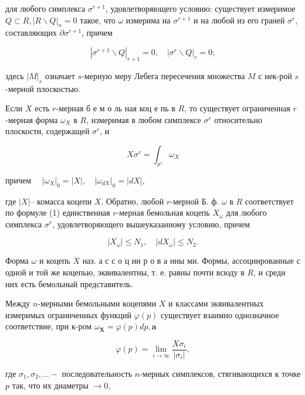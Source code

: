 \documentclass[10pt]{article}
\begin{document}
для любого симплекса $\sigma^{r+1}$, удовлетворяющего условию: существует измеримое $Q \subset R,|R \backslash Q|_{n}=0$ такое, что $\omega$ измерима на $\sigma^{r+1}$ и на любой из его граней $\sigma^{r}$, составляющих $\partial \sigma^{r+1}$, причем



\[

\left|\sigma^{r+1} \backslash Q\right|_{r+1}=0, \quad\left|\sigma^{r} \backslash Q\right|_{r}=0 ;

\]



здесь $|M|_{s}$ означает $s$-мерную меру Лебега пересечения множества $M$ с нек-рой $s$-мерной плоскостью.



Если $X$ есть $r$-мерная б е м о ль ная коц е пь в $R$, то существует ограниченная $r$-мерная форма $\omega_{X}$ в $R$, измеримая в любом симплексе $\sigma^{r}$ относительно плоскости, содержащей $\sigma^{r}$, и



\[

X \sigma^{r}=\int_{\sigma^{r}} \omega_{X}

\]



причем $\quad\left|\omega_{X}\right|_{0}=|X|, \quad\left|\omega_{d X}\right|_{0}=|d X|$,



где $|X|$-- комасса коцепи $X$. Обратно, любой $r$-мерной Б. ф. $\omega$ в $R$ соответствует по формуле (1) единственная $r$-мерная бемольная коцепь $X_{\omega}$ для любого симплекса $\sigma^{r}$, удовлетворяющего вышеуказанному условию, причем



\[

\left|X_{\omega}\right| \leqslant N_{1}, \quad\left|d X_{\omega}\right| \leqslant N_{2} .

\]



Форма $\omega$ и коцепь $X$ наз. а с с о ц ии р о в а нны ми. Формы, ассоциированные с одной и той же коцепью, эквивалентны, т. е. равны почти всюду в $R$, и среди них есть бемольный представитель.



Между $n$-мерными бемольными коцепями $X$ и классами эквивалентных измеримых ограниченных функций $\varphi(p)$ существует взаимно однозначное соответствие, при к-ром $\omega_{\boldsymbol{X}}=\varphi(p) d p, \mathbf{a}$



\[

\varphi(p)=\lim _{i \rightarrow \infty} \frac{X \sigma_{i}}{\left|\sigma_{i}\right|},

\]



где $\sigma_{1}, \sigma_{2}, \ldots-$ последовательность $n$-мерных симплексов, стягивающихся к точке $p$ так, что их диаметры $\rightarrow 0$,
\end{document}
